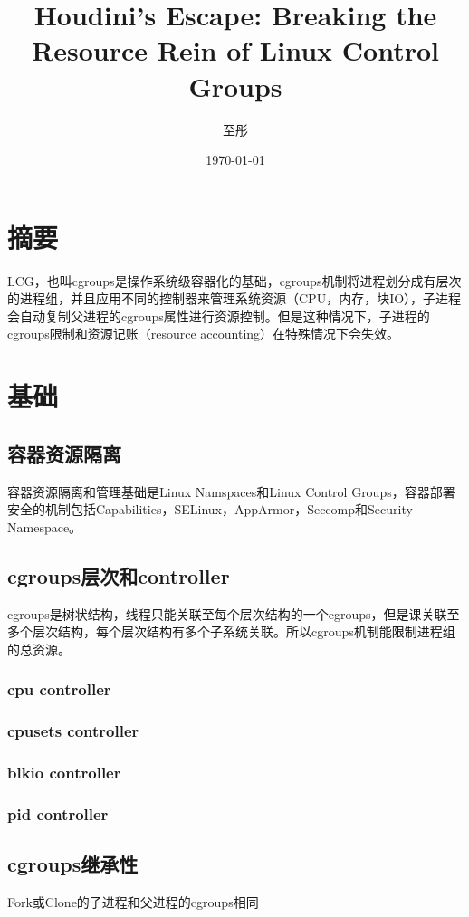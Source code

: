 \documentclass[UTF8]{ctexart}
\title{\heiti Houdini’s Escape: Breaking the Resource Rein of Linux Control Groups}
\author{\kaishu 至彤}
\date{\today}
\begin{document}
    
    \maketitle

    \clearpage
    \section{摘要}\label{sec:diyijie}
	LCG，也叫cgroups是操作系统级容器化的基础，cgroups机制将进程划分成有层次的进程组，并且应用不同的控制器来管理系统资源（CPU，内存，块IO），子进程会自动复制父进程的cgroups属性进行资源控制。但是这种情况下，子进程的cgroups限制和资源记账（resource accounting）在特殊情况下会失效。
	\clearpage

    \section{基础}\label{sec:dierjie}
    \subsection{容器资源隔离}
    容器资源隔离和管理基础是Linux Namspaces和Linux Control Groups，容器部署安全的机制包括Capabilities，SELinux，AppArmor，Seccomp和Security Namespace。
    \subsection{cgroups层次和controller}
    cgroups是树状结构，线程只能关联至每个层次结构的一个cgroups，但是课关联至多个层次结构，每个层次结构有多个子系统关联。所以cgroups机制能限制进程组的总资源。
    \subsubsection{cpu controller}
    \subsubsection{cpusets controller}
    \subsubsection{blkio  controller}
    \subsubsection{pid controller}
    \subsection{cgroups继承性}
    Fork或Clone的子进程和父进程的cgroups相同
	\clearpage
\end{document}
